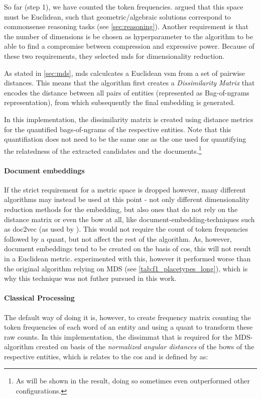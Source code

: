 So far (step 1), we have counted the token frequencies. \textcite{Derrac2015} argued that this space must be Euclidean, such that geometric/algebraic solutions correspond to commonsense reasoning tasks (see \autoref{sec:reasoning}). Another requirement is that the number of dimensions is be chosen as hyperparameter to the algorithm to be able to find a compromise between compression and expressive power. Because of these two requirements, they selected \gls{mds} for dimensionality reduction.

As stated in \autoref{sec:mds}, \gls{mds} calculcates a Euclidean \gls{vsm} from a set of pairwise distances. This means that the algorithm first creates a \textit{Dissimilarity Matrix} that encodes the distance between all pairs of entities (represented as Bag-of-ngrams representation), from which subsequently the final embedding is generated. 

In this implementation, the dissimilarity matrix is created using distance metrics for the quantified bags-of-ngrams of the respective entities. Note that this quantifiation does not need to be the same one as the one used for quantifying the relatedness of the extracted candidates and the documents.\footnote{As will be shown in the result, doing so sometimes even outperformed other configurations.}

\vspace{-0.4ex}
\paragraph{Document embeddings}
If the strict requirement for a metric space is dropped however, many different algorithms may instead be used at this point - not only different dimensionality reduction methods for the embedding, but also ones that do not rely on the distance matrix or even the \gls{bow} at all, like document-embedding-techniques such as \gls{doc2vec} \cite{Le2014} (as \eg used by \cite{Alshaikh2020}). This would not require the count of token frequencies followed by a \gls{quant}, but not affect the rest of the algorithm. As, however, document embeddings tend to be created on the basis of \gls{cos}, this will not result in a Euclidean metric. \textcite{Alshaikh2020} experimented with this, however it performed worse than the original algorithm relying on MDS (see \autoref{tab:f1_placetypes_long}), which is why this technique was not futher pursued in this work.

\vspace{-0.4ex}
\paragraph{Classical Processing}
The default way of doing it is, however, to create frequency matrix counting the token frequencies of each word of an entity and using a \gls{quant} to transform these raw counts. In this implementation, the \gls{dissimmat} that is required for the MDS-algorithm created on basis of the \emph{normalized angular distances} of the \glspl{bow} of the respective entities, which is relates to the \gls{cos} and is defined by \textcite{Derrac2015} as:

